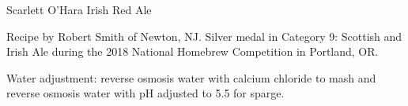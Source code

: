 \begin{recipe}{Scarlett O'Hara Irish Red Ale} %

\begin{aboutblock}
Recipe by Robert Smith of Newton, NJ. Silver medal in Category 9: Scottish and
Irish Ale during the 2018 National Homebrew Competition in Portland, OR.
\sourceaha
\end{aboutblock}


\begin{methodandtiming}
 
\begin{mashsteps}
\end{mashsteps}

\begin{fermentationsteps}
\end{fermentationsteps}

\begin{directions}
Water adjustment:  reverse osmosis water with  calcium
chloride to mash and  reverse osmosis water with pH adjusted to 5.5
for sparge.
\end{directions}

\end{methodandtiming}

\recipebreak

\begin{ingredientsblock}

\begin{malts}
\end{malts}

\begin{hops}
\end{hops}


\end{ingredientsblock}

\end{recipe}

